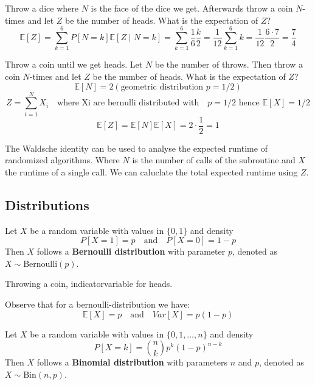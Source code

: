 \begin{example}
	Throw a dice where $N$ is the face of the dice we get. Afterwards throw a coin $N$-times and let $Z$ be the number of heads. What is the expectation of $Z$?
	$$\mathbb{E}[Z] = \sum_{k=1}^6 P[N=k] \mathbb{E}[Z \mid N=k] = \sum_{k=1}^6 \frac{1}{6} \frac{k}{2} = \frac{1}{12} \sum_{k=1}^6 k = \frac{1}{12} \frac{6 \cdot 7}{2} = \frac{7}{4}$$
\end{example}

\begin{example}
	Throw a coin until we get heads. Let $N$ be the number of throws. Then throw a coin $N$-times and let $Z$ be the number of heads. What is the expectation of $Z$?
	$$\mathbb{E}[N] = 2 (\text{geometric distribution } p = 1/2)$$
	$$Z = \sum_{i=1}^N X_i \quad \text{where Xi are bernulli distributed with} \quad p = 1/2 \text{ hence } \mathbb{E}[X] = 1/2$$
	$$\mathbb{E}[Z] = \mathbb{E}[N] \mathbb{E}[X] = 2 \cdot \frac{1}{2} = 1$$
\end{example}

\begin{remark}
	The Waldsche identity can be used to analyse the expected runtime of randomized algorithms. Where $N$ is the number of calls of the subroutine and $X$ the runtime of a single call. We can caluclate the total expected runtime using $Z$.
\end{remark}

\subsection{Distributions}

\begin{definition}
	Let $X$ be a random variable with values in $\{0,1\}$ and density
	$$P[X=1] = p \quad \text{and} \quad P[X=0] = 1-p$$
	Then $X$ follows a \textbf{Bernoulli distribution} with parameter $p$, denoted as $X \sim \text{Bernoulli}(p)$.
\end{definition}

\begin{example}
	Throwing a coin, indicatorvariable for heads.
\end{example}

\begin{remark}
	Observe that for a bernoulli-distribution we have:
	$$\mathbb{E}[X] = p \quad \text{and} \quad Var[X] = p(1-p)$$
\end{remark}

\begin{definition}
	Let $X$ be a random variable with values in $\{0,1,\dots,n\}$ and density
	$$P[X=k] = \binom{n}{k} p^k (1-p)^{n-k}$$
	Then $X$ follows a \textbf{Binomial distribution} with parameters $n$ and $p$, denoted as $X \sim \text{Bin}(n,p)$.
\end{definition}


